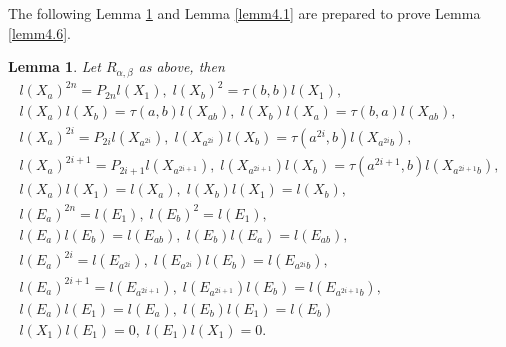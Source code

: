 \documentclass[a4paper,11pt]{amsart}
\numberwithin{equation}{section}
\newtheorem{lemma}[theorem]{Lemma}
\begin{document}
The following Lemma \ref{lemm4.5} and Lemma \ref{lemm4.1} are prepared to prove Lemma \ref{lemm4.6}.

\begin{lemma}\label{lemm4.5}
Let $R_{\alpha,\beta}$ as above, then
\begin{gather}
\label{el.1} l(X_a)^{2n}=P_{2n}l(X_1),\;l(X_b)^2=\tau(b,b)l(X_1),\\
\label{el.2} l(X_a)l(X_b)=\tau(a,b)l(X_{ab}),\;l(X_b)l(X_a)=\tau(b,a)l(X_{ab}),\\
\label{el.3} l(X_a)^{2i}=P_{2i}l(X_{a^{2i}}),\; l(X_{a^{2i}})l(X_b)=\tau(a^{2i},b)l(X_{a^{2i}b}),\\
\label{el.4} l(X_a)^{2i+1}=P_{2i+1}l(X_{a^{2i+1}}),\; l(X_{a^{2i+1}})l(X_b)=\tau(a^{2i+1},b)l(X_{a^{2i+1}b}),\\
\label{el.5} l(X_a)l(X_1)=l(X_a),\;l(X_b)l(X_1)=l(X_b),\\
\label{el.6} l(E_a)^{2n}=l(E_1),\;l(E_b)^2=l(E_1),\\
\label{el.7} l(E_a)l(E_b)=l(E_{ab}),\; l(E_b)l(E_a)=l(E_{ab}),\\
\label{el.8} l(E_a)^{2i}=l(E_{a^{2i}}),\; l(E_{a^{2i}})l(E_b)=l(E_{a^{2i}b}),\\
\label{el.9} l(E_a)^{2i+1}=l(E_{a^{2i+1}}),\; l(E_{a^{2i+1}})l(E_b)=l(E_{a^{2i+1}b}),\\
\label{el.10} l(E_a)l(E_1)=l(E_a),\;l(E_b)l(E_1)=l(E_b)\\
\label{el.11} l(X_1)l(E_1)=0,\;l(E_1)l(X_1)=0.
\end{gather}
\end{lemma}
\end{document}
